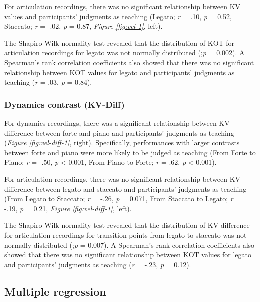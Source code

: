 \documentclass[
  man,floatsintext]{apa6}
\begin{document}
For articulation recordings, there was no significant relationship between KV values and participants' judgments as teaching (Legato; \emph{r} = .10, \emph{p} = 0.52, Staccato; \emph{r} = -.02, \emph{p} = 0.87, \emph{Figure \ref{fig:vel-1}}, left).

The Shapiro-Wilk normality test revealed that the distribution of KOT for articulation recordings for legato was not normally distributed (;\emph{p} = 0.002). A Spearman's rank correlation coefficients also showed that there was no significant relationship between KOT values for legato and participants' judgments as teaching (\emph{r} = .03, \emph{p} = 0.84).

\hypertarget{dynamics-contrast-kv-diff}{%
\subsubsection{Dynamics contrast (KV-Diff)}\label{dynamics-contrast-kv-diff}}

For dynamics recordings, there was a significant relationship between KV difference between forte and piano and participants' judgments as teaching (\emph{Figure \ref{fig:vel-diff-1}}, right). Specifically, performances with larger contrasts between forte and piano were more likely to be judged as teaching (From Forte to Piano; \emph{r} = -.50, \emph{p} \textless{} 0.001, From Piano to Forte; \emph{r} = .62, \emph{p} \textless{} 0.001).

For articulation recordings, there was no significant relationship between KV difference between legato and staccato and participants' judgments as teaching (From Legato to Staccato; \emph{r} = -.26, \emph{p} = 0.071, From Staccato to Legato; \emph{r} = -.19, \emph{p} = 0.21, \emph{Figure \ref{fig:vel-diff-1}}, left).

The Shapiro-Wilk normality test revealed that the distribution of KV difference for articulation recordings for transition points from legato to staccato was not normally distributed (;\emph{p} = 0.007). A Spearman's rank correlation coefficients also showed that there was no significant relationship between KOT values for legato and participants' judgments as teaching (\emph{r} = -.23, \emph{p} = 0.12).

\hypertarget{multiple-regression}{%
\subsection{Multiple regression}\label{multiple-regression}}
\end{document}
